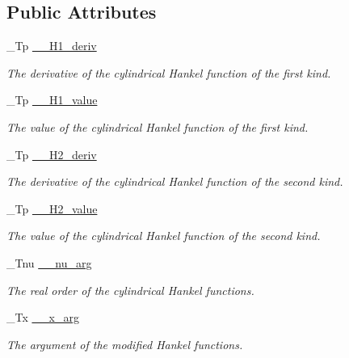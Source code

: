 \subsection*{Public Attributes}
\begin{DoxyCompactItemize}
\item 
\+\_\+\+Tp \hyperlink{struct____gnu__cxx_1_1____cyl__hankel__t_abdf155edcf5e494c4ba264f385c2407a}{\+\_\+\+\_\+\+H1\+\_\+deriv}
\begin{DoxyCompactList}\small\item\em The derivative of the cylindrical Hankel function of the first kind. \end{DoxyCompactList}\item 
\+\_\+\+Tp \hyperlink{struct____gnu__cxx_1_1____cyl__hankel__t_a8166d6e3378ad824fafcb5f440b65b3a}{\+\_\+\+\_\+\+H1\+\_\+value}
\begin{DoxyCompactList}\small\item\em The value of the cylindrical Hankel function of the first kind. \end{DoxyCompactList}\item 
\+\_\+\+Tp \hyperlink{struct____gnu__cxx_1_1____cyl__hankel__t_aac63a9d78d5e3ee6520073963da4cbbb}{\+\_\+\+\_\+\+H2\+\_\+deriv}
\begin{DoxyCompactList}\small\item\em The derivative of the cylindrical Hankel function of the second kind. \end{DoxyCompactList}\item 
\+\_\+\+Tp \hyperlink{struct____gnu__cxx_1_1____cyl__hankel__t_a968496d4d370d39f2034657f32860faa}{\+\_\+\+\_\+\+H2\+\_\+value}
\begin{DoxyCompactList}\small\item\em The value of the cylindrical Hankel function of the second kind. \end{DoxyCompactList}\item 
\+\_\+\+Tnu \hyperlink{struct____gnu__cxx_1_1____cyl__hankel__t_a67499e047360bcfc7c84f0e3c1d36dab}{\+\_\+\+\_\+nu\+\_\+arg}
\begin{DoxyCompactList}\small\item\em The real order of the cylindrical Hankel functions. \end{DoxyCompactList}\item 
\+\_\+\+Tx \hyperlink{struct____gnu__cxx_1_1____cyl__hankel__t_a7b1009ea94ea381fcae13abc9da8b9c6}{\+\_\+\+\_\+x\+\_\+arg}
\begin{DoxyCompactList}\small\item\em The argument of the modified Hankel functions. \end{DoxyCompactList}\end{DoxyCompactItemize}


